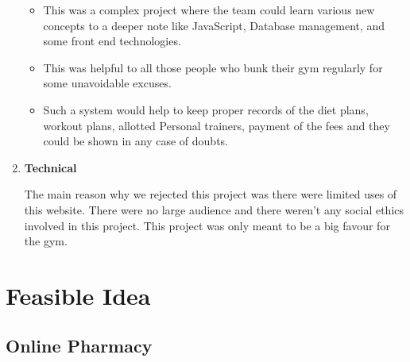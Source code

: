 \documentclass[fleqn,10pt]{../SelfArx} %
\begin{document}
\begin{enumerate}
\begin{itemize}
    \item	This was a complex project where the team could learn various new concepts to a deeper note like JavaScript, Database management, and some front end technologies.
  \item		This was helpful to all those people who bunk their gym regularly for some unavoidable excuses.
  \item		Such a system would help to keep proper records of the diet plans, workout plans, allotted
Personal trainers, payment of the fees and they could be shown in any case of doubts.
\end{itemize}

\item \textbf{ Technical }

The main reason why we rejected this project was there were limited uses of this website. There were no large audience and there weren’t any social ethics involved in this project.
This project was only meant to be a big favour for the gym.
\end{enumerate}

\section{Feasible Idea}

\subsection{Online Pharmacy}
\end{document}

